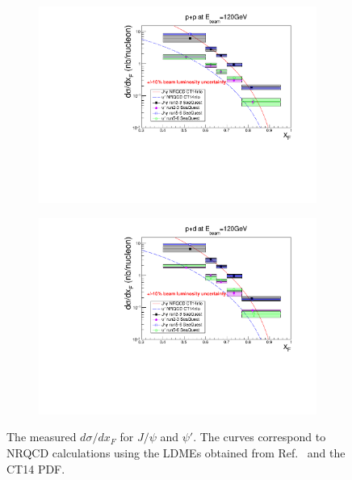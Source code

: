 \documentclass[reprint,aps,unsortedaddress,superscriptaddress,prd,floatfix,showpacs,linenumbers]{revtex4-2}
\begin{document}
\begin{figure}[h]
	\begin{subfigure}{0.45\linewidth}
		\includegraphics[width=\linewidth]{figures/crossSections/xF/combine_xF_LH2_5-6_5770_psip}
	\end{subfigure}
	\begin{subfigure}{0.45\linewidth}
		\includegraphics[width=\linewidth]{figures/crossSections/xF/combine_xF_LD2_5-6_5770_psip}
	\end{subfigure}
	\caption{The measured $d\sigma /d x_F$ for $J/\psi$ and $\psi'$. The curves correspond to NRQCD
		calculations using the LDMEs obtained from Ref.~\cite{hsieh2021} and the CT14 PDF.}
	\label{fig:xF_cross_sections}
\end{figure}
\end{document}
